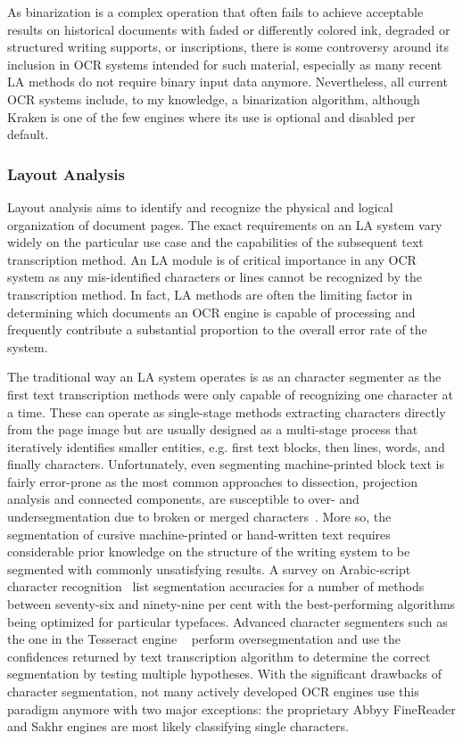 As binarization is a complex operation that often fails to achieve acceptable
results on historical documents with faded or differently colored ink, degraded
or structured writing supports, or inscriptions, there is some controversy
around its inclusion in OCR systems intended for such material, especially as
many recent LA methods do not require binary input data anymore. Nevertheless,
all current OCR systems include, to my knowledge, a binarization algorithm,
although Kraken is one of the few engines where its use is optional and
disabled per default.

\subsubsection{Layout Analysis}
\label{s:la}

Layout analysis aims to identify and recognize the physical and logical
organization of document pages. The exact requirements on an LA system vary
widely on the particular use case and the capabilities of the subsequent text
transcription method. An LA module is of critical importance in any OCR system
as any mis-identified characters or lines cannot be recognized by the
transcription method. In fact, LA methods are often the limiting factor in
determining which documents an OCR engine is capable of processing and
frequently contribute a substantial proportion to the overall error rate of the
system.

The traditional way an LA system operates is as an character segmenter as the
first text transcription methods were only capable of recognizing one character
at a time. These can operate as single-stage methods extracting characters
directly from the page image but are usually designed as a multi-stage process
that iteratively identifies smaller entities, e.g. first text blocks, then
lines, words, and finally characters. Unfortunately, even segmenting machine-printed
block text is fairly error-prone as the most common approaches to dissection,
projection analysis and connected components, are susceptible to over- and
undersegmentation due to broken or merged characters~\cite[sec.
2]{casey1996survey}. More so, the segmentation of cursive machine-printed or
hand-written text requires considerable prior knowledge on the structure of the
writing system to be segmented with commonly unsatisfying results. A survey on
Arabic-script character recognition~\cite{alginahi2013survey} list segmentation
accuracies for a number of methods between seventy-six and ninety-nine per cent
with the best-performing algorithms being optimized for particular typefaces.
Advanced character segmenters such as the one in the Tesseract engine
~\cite{smith2007overview} perform oversegmentation and use the confidences
returned by text transcription algorithm to determine the correct segmentation
by testing multiple hypotheses. With the significant drawbacks of character
segmentation, not many actively developed OCR engines use this paradigm anymore
with two major exceptions: the proprietary Abbyy FineReader and Sakhr engines
are most likely classifying single characters.

